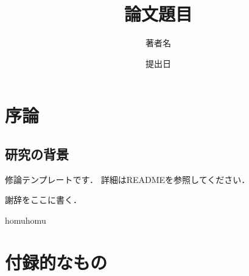 \documentclass[a4j,12pt,report]{jsbook}
\title{論文題目} %
\author{著者名} %
\date{提出日} %
\begin{document}
\maketitle

\clearpage

\setcounter{page}{1}
\tableofcontents
\newpage

\chapter{序論}
\section{研究の背景}
修論テンプレート\cite{template}です．
詳細はREADMEを参照してください．

\acknowledgement
謝辞をここに書く．




\begin{relatedworks}{9}
  homuhomu
\end{relatedworks}

\appendix
\chapter{付録的なもの}
\end{document}
